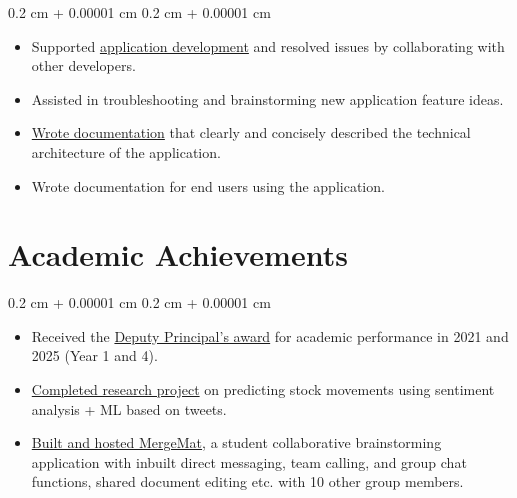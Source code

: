 \documentclass[10pt, letterpaper]{article}
\newenvironment{highlights}{
    \begin{itemize}[
        topsep=0.10 cm,
        parsep=0.10 cm,
        partopsep=0pt,
        itemsep=0pt,
        leftmargin=0.4 cm + 10pt
    ]
}{
    \end{itemize}
} %
\newenvironment{onecolentry}{
    \begin{adjustwidth}{
        0.2 cm + 0.00001 cm
    }{
        0.2 cm + 0.00001 cm
    }
}{
    \end{adjustwidth}
} %
\begin{document}
    \begin{onecolentry}
        \begin{highlights}
            \item Supported \underline{application development} and resolved issues by collaborating with other developers.
            \item Assisted in troubleshooting and brainstorming new application feature ideas.
            \item \underline{Wrote documentation} that clearly and concisely described the technical architecture of the application.
            \item Wrote documentation for end users using the application.

        \end{highlights}
    \end{onecolentry}


                \section{ Academic Achievements}
    \vspace{0.10 cm}
        \begin{onecolentry}
          \begin{highlights}
            \item Received the \underline{Deputy Principal's award} for academic performance in 2021 and 2025 (Year 1 and 4). 
            \item \underline{Completed research project} on predicting stock movements using sentiment analysis + ML based on tweets.
            \item \underline{Built and hosted MergeMat}, a student collaborative brainstorming application with inbuilt direct messaging, team calling, and group chat functions, shared document editing etc. with 10 other group members.
          \end{highlights}
        \end{onecolentry}
\end{document}
